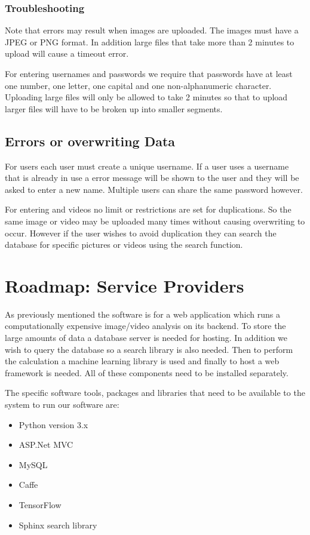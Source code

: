 \documentclass{scrreprt}
\begin{document}
\subsubsection{Troubleshooting}

Note that errors may result when images are uploaded.  The images must have a
JPEG or PNG format.  In addition large files that take more than 2 minutes to
upload will cause a timeout error.

For entering usernames and passwords we require that passwords have at least
one number, one letter, one capital and one non-alphanumeric character.
Uploading large files will only be allowed to take 2 minutes so that to upload
larger files will have to be broken up into smaller segments.


\subsection{Errors or overwriting Data}

For users each user must create a unique username.  If a user uses a username
that is already in use a error message will be shown to the user and they will
be asked to enter a new name.  Multiple users can share the same password
however.

For entering and videos no limit or restrictions are set for duplications.  So
the same image or video may be uploaded many times without causing overwriting
to occur.  However if the user wishes to avoid duplication they can search the
database for specific pictures or videos using the search function.


\section{Roadmap: Service Providers}

As previously mentioned the software is for a  web application which runs a
computationally expensive image/video analysis on its backend. To store the
large amounts of data a database server is needed for hosting.  In addition we
wish to query the database so a search library is also needed. Then to perform
the calculation a machine learning library is used and finally to host a web
framework is needed. All of these components need to be installed separately.

The specific software tools, packages and libraries that need to be available
to the system to run our software are:

\begin{itemize}
  \item Python version 3.x
  \item ASP.Net MVC
  \item MySQL
  \item Caffe
  \item TensorFlow
  \item Sphinx search library
\end{itemize}
\end{document}
